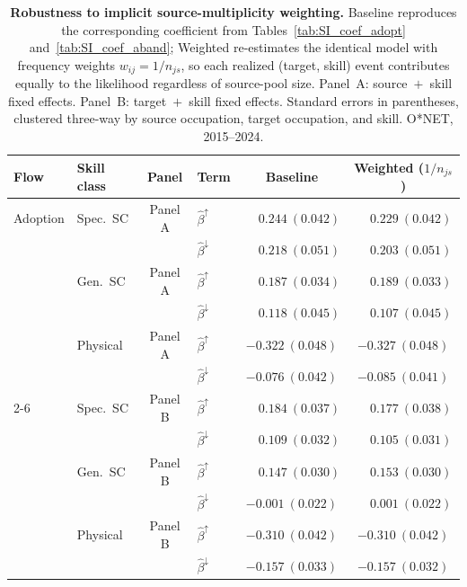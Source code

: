 \begin{table}[H]
\centering
\caption{\textbf{Robustness to implicit source-multiplicity weighting.} Baseline reproduces the corresponding coefficient from Tables~\ref{tab:SI_coef_adopt} and~\ref{tab:SI_coef_aband}; Weighted re-estimates the identical model with frequency weights $w_{ij} = 1/n_{js}$, so each realized (target, skill) event contributes equally to the likelihood regardless of source-pool size. Panel~A: source~$+$~skill fixed effects. Panel~B: target~$+$~skill fixed effects. Standard errors in parentheses, clustered three-way by source occupation, target occupation, and skill. O*NET, 2015--2024.}
\label{tab:SI_weighting}
\renewcommand{\arraystretch}{1.05}
\setlength{\tabcolsep}{3pt}
\footnotesize
\begin{tabular}{llclcc}
\toprule
Flow & Skill class & Panel & Term & Baseline & Weighted ($1/n_{js}$) \\
\midrule

Adoption & Spec.\ SC & Panel A
   & $\hat{\beta}^{\uparrow}$
   & $\phantom{-}0.244\ (0.042)$ & $\phantom{-}0.229\ (0.042)$ \\[2pt]
 & & & $\hat{\beta}^{\downarrow}$
   & $\phantom{-}0.218\ (0.051)$ & $\phantom{-}0.203\ (0.051)$ \\[4pt]
 & Gen.\ SC & Panel A
   & $\hat{\beta}^{\uparrow}$
   & $\phantom{-}0.187\ (0.034)$ & $\phantom{-}0.189\ (0.033)$ \\[2pt]
 & & & $\hat{\beta}^{\downarrow}$
   & $\phantom{-}0.118\ (0.045)$ & $\phantom{-}0.107\ (0.045)$ \\[4pt]
 & Physical & Panel A
   & $\hat{\beta}^{\uparrow}$
   & $-0.322\ (0.048)$ & $-0.327\ (0.048)$ \\[2pt]
 & & & $\hat{\beta}^{\downarrow}$
   & $-0.076\ (0.042)$ & $-0.085\ (0.041)$ \\
\cmidrule(lr){2-6}
  & Spec.\ SC & Panel B
   & $\hat{\beta}^{\uparrow}$
   & $\phantom{-}0.184\ (0.037)$ & $\phantom{-}0.177\ (0.038)$ \\[2pt]
 & & & $\hat{\beta}^{\downarrow}$
   & $\phantom{-}0.109\ (0.032)$ & $\phantom{-}0.105\ (0.031)$ \\[4pt]
 & Gen.\ SC & Panel B
   & $\hat{\beta}^{\uparrow}$
   & $\phantom{-}0.147\ (0.030)$ & $\phantom{-}0.153\ (0.030)$ \\[2pt]
 & & & $\hat{\beta}^{\downarrow}$
   & $-0.001\ (0.022)$ & $\phantom{-}0.001\ (0.022)$ \\[4pt]
 & Physical & Panel B
   & $\hat{\beta}^{\uparrow}$
   & $-0.310\ (0.042)$ & $-0.310\ (0.042)$ \\[2pt]
 & & & $\hat{\beta}^{\downarrow}$
   & $-0.157\ (0.033)$ & $-0.157\ (0.032)$ \\
\midrule


\end{tabular}
\end{table}

